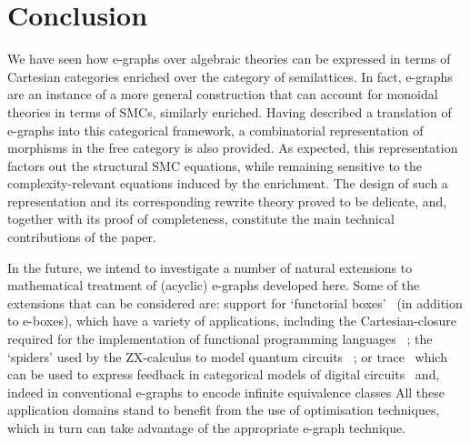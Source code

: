 \section{Conclusion}
\label{sec:conclusion}

We have seen how e-graphs over algebraic theories can be expressed in terms of Cartesian categories enriched over the category of semilattices. 
In fact, e-graphs are an instance of a more general construction that can account for monoidal theories in terms of SMCs,  similarly enriched.  
Having described a translation of e-graphs into this categorical framework, a combinatorial representation of morphisms in the free category is also provided. 
As expected, this representation factors out the structural SMC equations, while remaining sensitive to the complexity-relevant equations induced by the enrichment.  
The design of such a representation and its corresponding rewrite theory proved to be delicate, and, together with its proof of completeness, constitute the main technical contributions of the paper.  

In the future,  we intend to investigate a number of natural extensions to mathematical treatment of (acyclic) e-graphs developed here.
Some of the extensions that can be considered are: support for `functorial boxes'~\cite{mellies_functorial_2006} (in addition to e-boxes), which have a variety of applications, including the Cartesian-closure required for the implementation of functional programming languages~\cite{ghica-zanassi2023string}
; the `spiders' used by the ZX-calculus to model quantum circuits~\cite{coecke_interacting_2011,ZX}
; or trace~\cite{joyal_geometry_1991, Hasegawa-traced} which can be used to express feedback in categorical models of digital circuits~\cite{ghica_jung_2017,ghica_compositional_2023} and, indeed in conventional e-graphs to encode infinite equivalence classes
All these application domains stand to benefit from the use of optimisation techniques, which in turn can take advantage of the appropriate e-graph technique.


